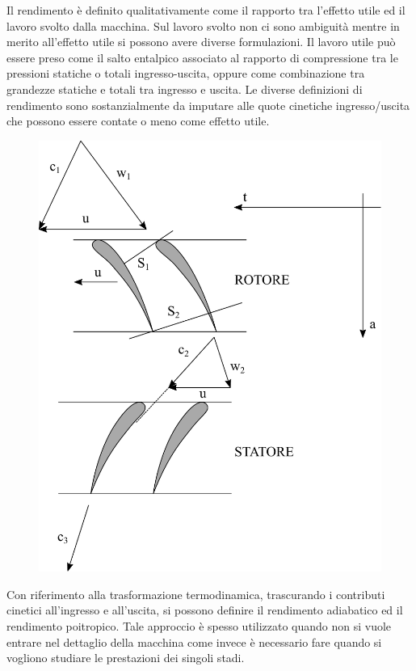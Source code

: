 Il rendimento è definito qualitativamente come il rapporto tra l'effetto utile ed il lavoro svolto dalla macchina. Sul lavoro svolto non ci sono ambiguità mentre in merito all'effetto utile si possono avere diverse formulazioni. Il lavoro utile può essere preso come il salto entalpico associato al rapporto di compressione tra le pressioni statiche o totali ingresso-uscita, oppure come combinazione tra grandezze statiche e totali tra ingresso e uscita. Le diverse definizioni di rendimento sono sostanzialmente da imputare alle quote cinetiche ingresso/uscita che possono essere contate o meno come effetto utile.
\begin{figure}
\centering
  \includegraphics[width=.5\textwidth]{fig/schieraTComp.pdf}
\caption{}
\label{fig:schieraTComp}
\end{figure}
Con riferimento alla trasformazione termodinamica, trascurando i contributi cinetici all'ingresso e all'uscita, si possono definire il rendimento adiabatico ed il rendimento poitropico. Tale approccio è spesso utilizzato quando non si vuole entrare nel dettaglio della macchina come invece è necessario fare quando si vogliono studiare le prestazioni dei singoli stadi. 

